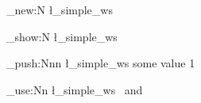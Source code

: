 \documentclass{article}
\begin{document}
\ws_new:N \l_simple_ws

\ws_show:N \l_simple_ws

\ws_push:Nnn \l_simple_ws
  { some value }
  { 1 }

\ws_use:Nn \l_simple_ws {~and~}
\end{document}
